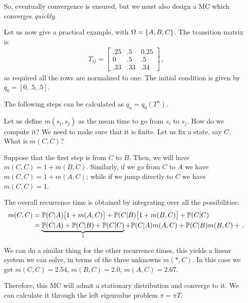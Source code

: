 \documentclass[main.tex]{subfiles}
\begin{document}
So, eventually convergence is ensured, but we must also design a MC which converges \emph{quickly}. 

Let us now give a practical example, with \(\Omega = \qty{A, B, C}\).
The transition matrix is 
%
\begin{align}
T_{ij} = 
\left[\begin{array}{ccc}
\num{.25} & \num{.5} & \num{0.25} \\ 
0 & \num{.5} & \num{.5} \\ 
\num{.33} & \num{.33} & \num{.34}
\end{array}\right]
\,,
\end{align}
%
as required all the rows are normalized to one. 
The initial condition is given by \(q_0 = [0, \num{.5}, \num{.5}]\).

The following steps can be calculated as \(q_n = q_0 (T^{n}) \).

Let us define \(m(s_i, s_j)\) as the mean time to go from \(s_i\) to \(s_j\). How do we compute it? We need to make sure that it is finite.
Let us fix a state, say \(C\). What is \(m(C, C)\)?

Suppose that the first step is from \(C\) to \(B\). Then, we will have \(m(C,C) = 1 + m(B, C)\). Similarly, if we go from \(C\) to \(A\) we have \(m(C, C) = 1 + m(A, C)\); while if we jump directly to \(C\) we have \(m(C, C) =1\). 

The overall recurrence time is obtained by integrating over all the possibilities: 
%
\begin{align}
m(C, C) &= 
\mathbb{P}(C | A) \qty[1 + m(A, C)] + 
\mathbb{P}(C | B) \qty[1 + m(B, C)] 
+  \mathbb{P}(C | C)  \\
&= 
\underbrace{\mathbb{P}(C |A ) +
\mathbb{P}(C |B) +
\mathbb{P}(C |C )}_{1} +
\mathbb{P}(C |A ) m(A, C) +
\mathbb{P}(C |B ) m(B, C) +
\,.
\end{align}

We can do a similar thing for the other recurrence times, this yields a linear system we can solve, in terms of the three unknowns \(m(*, C)\). 
In this case we get \(m(C, C) = \num{2.54}\), \(m(B, C) = \num{2.0}\), \(m(A,C) = \num{2.67}\). 

Therefore, this MC will admit a stationary distribution and converge to it.
We can calculate it through the left eigenvalue problem \(\pi = \pi T\). 
\end{document}
